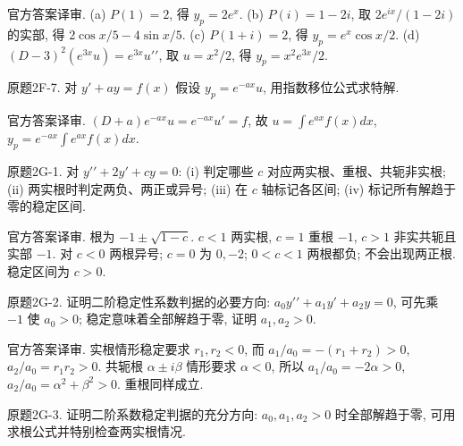 \begin{solution}
官方答案译审. (a) $P(1)=2$, 得 $y_p=2e^x$. (b) $P(i)=1-2i$, 取 $2e^{ix}/(1-2i)$ 的实部, 得 $2\cos x/5-4\sin x/5$. (c) $P(1+i)=2$, 得 $y_p=e^x\cos x/2$. (d) $(D-3)^2(e^{3x}u)=e^{3x}u\prime\prime$, 取 $u=x^2/2$, 得 $y_p=x^2e^{3x}/2$.
\end{solution}
\begin{exercise}\label{cw:bank-2F-7}
原题2F-7. 对 $y\prime+ay=f(x)$ 假设 $y_p=e^{-ax}u$, 用指数移位公式求特解.
\end{exercise}
\begin{solution}
官方答案译审. $(D+a)e^{-ax}u=e^{-ax}u\prime=f$, 故 $u=\int e^{ax}f(x)dx$, $y_p=e^{-ax}\int e^{ax}f(x)dx$.
\end{solution}
\begin{exercise}\label{cw:bank-2G-1}
原题2G-1. 对 $y\prime\prime+2y\prime+cy=0$: (i) 判定哪些 $c$ 对应两实根、重根、共轭非实根; (ii) 两实根时判定两负、两正或异号; (iii) 在 $c$ 轴标记各区间; (iv) 标记所有解趋于零的稳定区间.
\end{exercise}
\begin{solution}
官方答案译审. 根为 $-1\pm\sqrt{1-c}$. $c<1$ 两实根, $c=1$ 重根 $-1$, $c>1$ 非实共轭且实部 $-1$. 对 $c<0$ 两根异号; $c=0$ 为 $0,-2$; $0<c<1$ 两根都负; 不会出现两正根. 稳定区间为 $c>0$.\begin{center}\end{center}
\end{solution}
\begin{exercise}\label{cw:bank-2G-2}
原题2G-2. 证明二阶稳定性系数判据的必要方向: $a_0y\prime\prime+a_1y\prime+a_2y=0$, 可先乘 $-1$ 使 $a_0>0$; 稳定意味着全部解趋于零, 证明 $a_1,a_2>0$.
\end{exercise}
\begin{solution}
官方答案译审. 实根情形稳定要求 $r_1,r_2<0$, 而 $a_1/a_0=-(r_1+r_2)>0$, $a_2/a_0=r_1r_2>0$. 共轭根 $\alpha\pm i\beta$ 情形要求 $\alpha<0$, 所以 $a_1/a_0=-2\alpha>0$, $a_2/a_0=\alpha^2+\beta^2>0$. 重根同样成立.
\end{solution}
\begin{exercise}\label{cw:bank-2G-3}
原题2G-3. 证明二阶系数稳定判据的充分方向: $a_0,a_1,a_2>0$ 时全部解趋于零, 可用求根公式并特别检查两实根情况.
\end{exercise}
